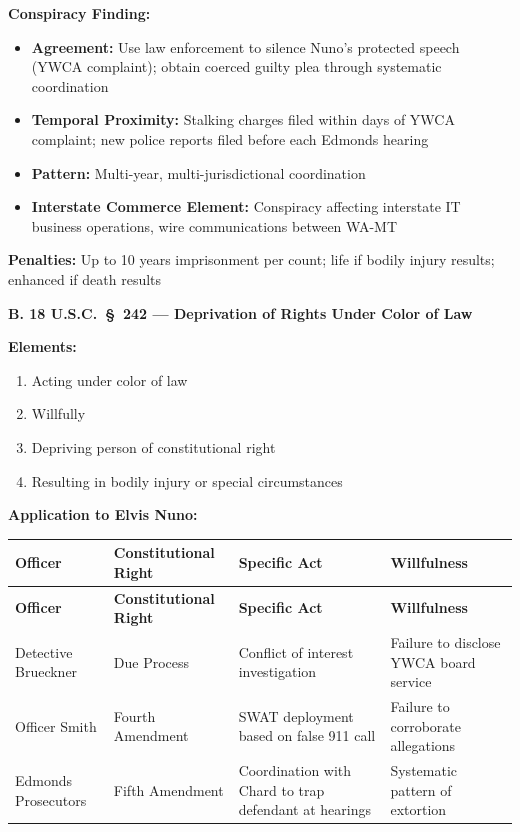 \documentclass[11pt, letterpaper]{article}
\newcommand{\subsectiontitle}[1]{\vspace{0.15in}\noindent\textcolor{NavyBlue}{\textbf{#1}}\vspace{0.05in}}
\begin{document}
\textbf{Conspiracy Finding:}
\begin{itemize}[leftmargin=*,itemsep=2pt]
    \item \textbf{Agreement:} Use law enforcement to silence Nuno's protected speech (YWCA complaint); obtain coerced guilty plea through systematic coordination
    \item \textbf{Temporal Proximity:} Stalking charges filed within days of YWCA complaint; new police reports filed before each Edmonds hearing
    \item \textbf{Pattern:} Multi-year, multi-jurisdictional coordination
    \item \textbf{Interstate Commerce Element:} Conspiracy affecting interstate IT business operations, wire communications between WA-MT
\end{itemize}

\textbf{Penalties:} Up to 10 years imprisonment per count; life if bodily injury results; enhanced if death results

\subsectiontitle{B. 18 U.S.C.\ \S\ 242 --- Deprivation of Rights Under Color of Law}

\textbf{Elements:}
\begin{enumerate}[leftmargin=*,itemsep=2pt]
    \item Acting under color of law
    \item Willfully
    \item Depriving person of constitutional right
    \item Resulting in bodily injury or special circumstances
\end{enumerate}

\textbf{Application to Elvis Nuno:}

\begin{center}
\begin{longtable}{|p{1.1in}|p{1.3in}|p{1.5in}|p{1.3in}|}
\hline
\textbf{Officer} & \textbf{Constitutional Right} & \textbf{Specific Act} & \textbf{Willfulness} \\
\hline
\endfirsthead
\hline
\textbf{Officer} & \textbf{Constitutional Right} & \textbf{Specific Act} & \textbf{Willfulness} \\
\hline
\endhead
Detective Brueckner & Due Process & Conflict of interest investigation & Failure to disclose YWCA board service \\
\hline
Officer Smith & Fourth Amendment & SWAT deployment based on false 911 call & Failure to corroborate allegations \\
\hline
Edmonds Prosecutors & Fifth Amendment & Coordination with Chard to trap defendant at hearings & Systematic pattern of extortion \\
\hline
\end{longtable}
\end{center}
\end{document}
